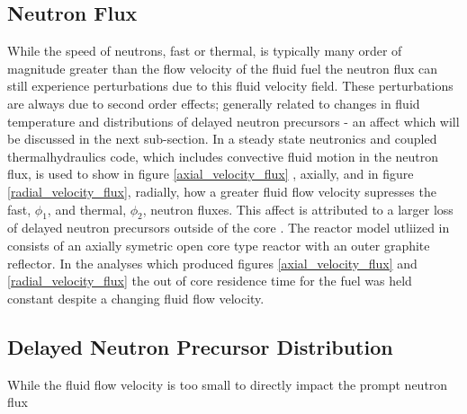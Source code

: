 \documentclass[review]{elsarticle}
\begin{document}
\subsection{Neutron Flux} \label{flux}
While the speed of neutrons, fast or thermal, is typically many order of magnitude greater than
the flow velocity of the fluid fuel the neutron flux can still experience
perturbations due to this fluid velocity field. These perturbations are always
due to second order effects; generally related to changes in fluid temperature
and distributions of delayed neutron precursors - an affect which will be
discussed in the next sub-section. In \cite{zhang_development_2009-1} a steady
state neutronics and coupled thermalhydraulics code, which includes convective
fluid motion in the neutron flux, is used to show in figure 
\ref{axial_velocity_flux}
, axially, and in figure \ref{radial_velocity_flux}, radially, how a greater fluid flow
 velocity supresses the fast, $\phi_{1}$, and thermal, $\phi_{2}$, neutron fluxes. This affect is
 attributed to a larger loss of delayed neutron precursors outside of the core \cite{zhang_development_2009-1}.
  The reactor model
 utliized in \cite{zhang_development_2009-1} consists of an axially symetric
 open core type reactor with an outer graphite reflector. In the analyses which
 produced figures \ref{axial_velocity_flux} and \ref{radial_velocity_flux} the
 out of core residence time for the fuel was held constant despite a changing
 fluid flow velocity.



\subsection{Delayed Neutron Precursor Distribution} \label{dnpd}
While the fluid flow velocity is too small to directly impact the prompt neutron
flux
\end{document}
